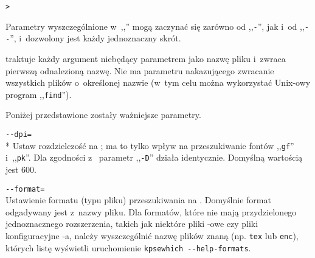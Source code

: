 \documentclass{article}
\renewcommand{\samp}[1]{,,\texttt{#1}''}  %
\begin{document}
\begin{alltt}
> 
\end{alltt}
Parametry wyszczególnione w~,,'' mogą zaczynać się  zarówno od
\samp{-}, jak i~od \samp{-{}-}, i~dozwolony jest każdy jednoznaczny skrót.

\KPS{} traktuje każdy argument niebędący parametrem jako nazwę pliku
i~zwraca pierwszą odnalezioną nazwę.
Nie ma parametru nakazującego zwracanie wszystkich   plików o~określonej
nazwie (w~tym celu można wykorzystać Unix-owy program \samp{find}).

Poniżej przedstawione zostały ważniejsze parametry.

\begin{ttdescription}
\item[\texttt{-{}-dpi=\var{num}}]\mbox{}\\*
  Ustaw rozdzielczość na ; ma to tylko wpływ na
  przeszukiwanie fontów \samp{gf} i~\samp{pk}.  Dla zgodności
  z~ parametr
  \samp{-D} działa identycznie. Domyślną wartością jest 600.
\item[\texttt{-{}-format=\var{nazwa}}]\mbox{}\\
  Ustawienie formatu (typu pliku) przeszukiwania na .
  Domyślnie format odgadywany jest z~nazwy pliku.
  Dla formatów, które nie mają przydzielonego jednoznacznego rozszerzenia,
  takich jak niektóre pliki \MP{}-owe czy pliki konfiguracyjne
  -a, należy wyszczególnić nazwę plików znaną \KPS{} (np. \texttt{tex} lub \texttt{enc}), których listę wyświetli uruchomienie \texttt{kpsewhich -{}-help-formats}.


\end{ttdescription}
\end{document}
